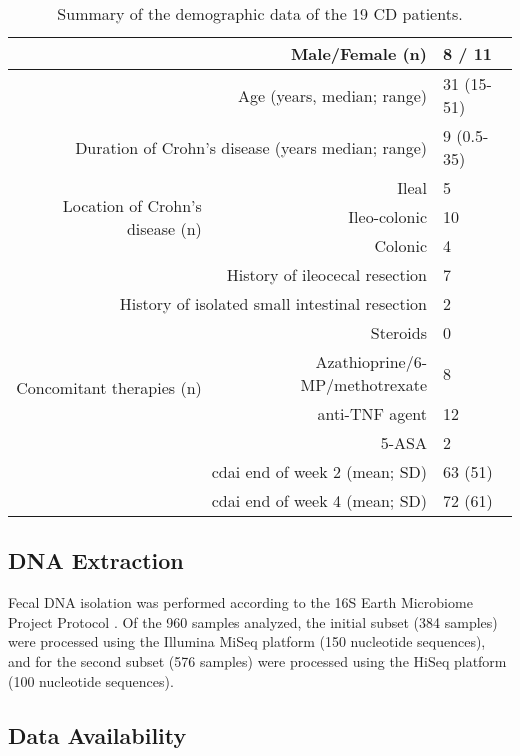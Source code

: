 \begin{table}[htbp]
    \centering
    \caption{Summary of the demographic data of the 19 CD patients.}
    \label{id-tabMethods}
    \begin{tabular}{rrl}
    \toprule
         \multicolumn{2}{r}{Male/Female (n)} &	8 / 11\\
    \midrule
    \multicolumn{2}{r}{Age (years, median; range)} &	31 (15-51)\\
\midrule
\multicolumn{2}{r}{Duration of Crohn's disease (years median; range)} &	9 (0.5-35)\\
\midrule
\multirow{3}{*}{Location of Crohn's disease (n)} & 	Ileal & 5\\
 &   	Ileo-colonic & 10\\
 &     	Colonic	 & 4\\
\midrule
\multicolumn{2}{r}{History of ileocecal resection} &	7\\
\midrule
\multicolumn{2}{r}{History of isolated small intestinal resection} &	2\\
\midrule
\multirow{4}{*}{Concomitant therapies (n)} &        	Steroids & 0\\
&        	Azathioprine/6-MP/methotrexate & 8\\
 &        	anti-TNF agent & 12\\
     &   	5-ASA	 &2\\
\midrule
\multicolumn{2}{r}{\gls{cdai} end of week 2 (mean; SD)} &	63 (51)\\
\midrule
\multicolumn{2}{r}{\gls{cdai} end of week 4 (mean; SD)} &	72 (61)\\
\bottomrule
    \end{tabular}
\end{table}

\subsection{DNA Extraction}

Fecal DNA isolation was performed according to the 16S Earth Microbiome Project 
Protocol \cite{RN164}. Of the 960 samples analyzed, the initial subset (384 
samples)  were processed using the Illumina MiSeq platform (150 nucleotide 
sequences), and for the second subset (576 samples) were processed using the 
HiSeq platform (100 nucleotide sequences).

\subsection{Data Availability}

